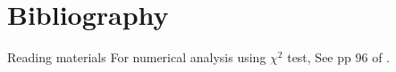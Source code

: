 \documentclass[11pt,ignorenonframetext,aspectratio=169]{beamer}
\newif\ifbibliography
\begin{document}
\hypertarget{bibliography}{%
\section{Bibliography}\label{bibliography}}

\begin{frame}{Reading materials}
\protect\hypertarget{reading-materials}{}
For numerical analysis using \(\chi^2\) test, See pp 96 of
\textcite{griffiths2015introduction}.
\end{frame}


  \begin{frame}[allowframebreaks]{}
  \bibliographytrue
  \printbibliography[heading=none]
  \end{frame}
\end{document}
